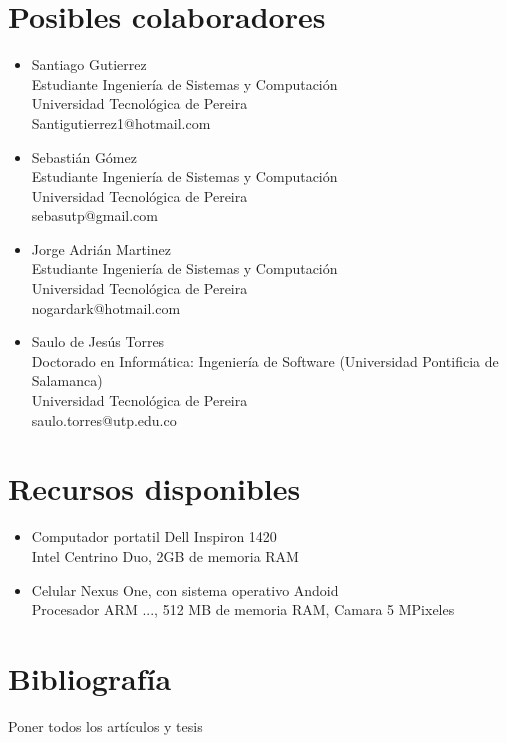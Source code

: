 \documentclass[a4paper, 11pt, oneside]{article}
\begin{document}
	\section{Posibles colaboradores}
	\begin{itemize}
   \item Santiago Gutierrez\\
Estudiante Ingeniería de Sistemas y Computación\\
Universidad Tecnológica de Pereira\\
Santigutierrez1@hotmail.com
   \item Sebastián Gómez\\
Estudiante Ingeniería de Sistemas y Computación\\
Universidad Tecnológica de Pereira\\
sebasutp@gmail.com
   \item Jorge Adrián Martinez\\
Estudiante Ingeniería de Sistemas y Computación\\
Universidad Tecnológica de Pereira\\
nogardark@hotmail.com
   \item Saulo de Jesús Torres\\
Doctorado en Informática: Ingeniería de Software (Universidad Pontificia de Salamanca)\\
Universidad Tecnológica de Pereira\\
saulo.torres@utp.edu.co
	\end{itemize}
	\clearpage
	
	\section{Recursos disponibles}
	\begin{itemize}
		\item Computador portatil Dell Inspiron 1420\\
			Intel Centrino Duo, 2GB de memoria RAM
		\item Celular Nexus One, con sistema operativo Andoid\\
			Procesador ARM ..., 512 MB de memoria RAM, Camara 5 MPixeles
	\end{itemize}
	\clearpage
	
	\section{Bibliografía}
	Poner todos los artículos y tesis
\end{document}
